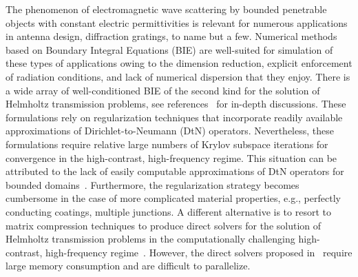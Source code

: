 \documentclass[11pt]{article}
\numberwithin{equation}{section}
\begin{document}
The phenomenon of electromagnetic wave scattering by bounded penetrable objects with constant electric permittivities is relevant for numerous applications in antenna design, diffraction gratings, to name but a few. Numerical methods based on Boundary Integral Equations (BIE) are well-suited for simulation of these types of applications owing to the dimension reduction, explicit enforcement of radiation conditions, and lack of numerical dispersion that they enjoy. There is a wide array of well-conditioned BIE of the second kind for the solution of Helmholtz transmission problems, see references~\cite{turc2,boubendir2015regularized} for in-depth discussions. These formulations rely on regularization techniques that incorporate readily available approximations of Dirichlet-to-Neumann (DtN) operators. Nevertheless, these formulations require relative large numbers of Krylov subspace iterations  for convergence in the high-contrast, high-frequency regime. This situation can be attributed to the lack of easily computable approximations of DtN operators for bounded domains~\cite{boubendir2015regularized}. Furthermore, the regularization strategy becomes cumbersome in the case of more complicated material properties, e.g., perfectly conducting coatings, multiple junctions. A different alternative is to resort to matrix compression techniques to produce direct solvers for the solution of Helmholtz transmission problems in the computationally challenging high-contrast, high-frequency regime~\cite{greengard1,greengard2}. However, the direct solvers proposed in~\cite{greengard1,greengard2} require large memory consumption and are difficult to parallelize. 
\end{document}
